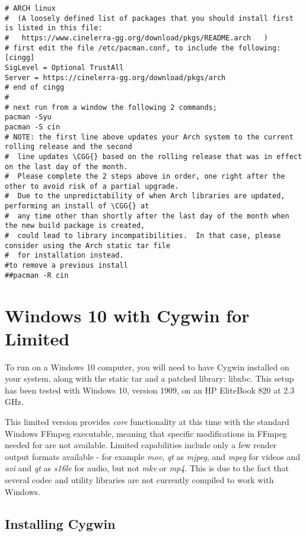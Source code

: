 \begin{lstlisting}[numbers=none]
# ARCH linux
#  (A loosely defined list of packages that you should install first is listed in this file:
#   https://www.cinelerra-gg.org/download/pkgs/README.arch   )
# first edit the file /etc/pacman.conf, to include the following:
[cingg]
SigLevel = Optional TrustAll
Server = https://cinelerra-gg.org/download/pkgs/arch
# end of cingg
#
# next run from a window the following 2 commands;
pacman -Syu
pacman -S cin
# NOTE: the first line above updates your Arch system to the current rolling release and the second
#  line updates \CGG{} based on the rolling release that was in effect on the last day of the month.
#  Please complete the 2 steps above in order, one right after the other to avoid risk of a partial upgrade.
#  Due to the unpredictability of when Arch libraries are updated, performing an install of \CGG{} at
#  any time other than shortly after the last day of the month when the new build package is created,
#  could lead to library incompatibilities.  In that case, please consider using the Arch static tar file
#  for installation instead.
#to remove a previous install
##pacman -R cin
\end{lstlisting}

\section{Windows 10 with Cygwin for \CGG{} Limited}%
\label{sec:ms_windows10}

To run \CGG{} on a Windows 10 computer, you will need to have Cygwin installed on your system, 
along with the  \CGG{} static tar and a patched library: libxbc.  This setup has been tested 
with Windows 10, version 1909, on an HP EliteBook 820 at 2.3 GHz.

This limited version provides \textit{core} functionality at this time with the standard Windows FFmpeg
executable, meaning that specific modifications in FFmpeg needed for \CGG{} are not available. 
Limited capabilities include only a few render output formats available - for example \textit{mov}, \textit{qt} 
as \textit{mjpeg}, and \textit{mpeg} for videos and \textit{avi} and \textit{qt} as \textit{s16le} 
for audio, but not \textit{mkv} or \textit{mp4}.  
This is due to the fact that several codec and utility libraries are not currently compiled to 
work with Windows.

\subsection*{Installing Cygwin}
\label{sec:installing_cygwin}

